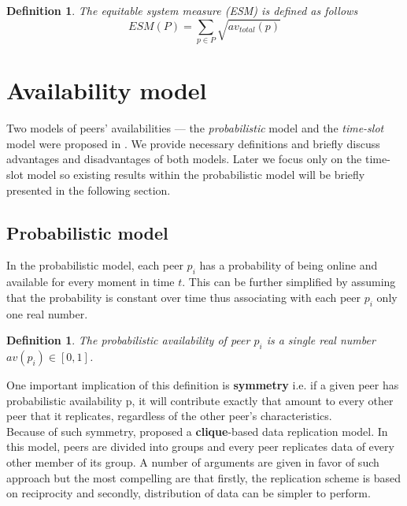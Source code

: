 \documentclass{pracamgren}
\newcounter{collective_ctr} \numberwithin{collective_ctr}{chapter}
\newtheorem{definition}[collective_ctr]{Definition}
\begin{document}
\begin{definition}
The {\it equitable system measure (ESM)} is defined as follows
$$ESM(P) = \sum_{p\in P} \sqrt{av_{total}(p)}$$
\end{definition}

\section{Availability model}\label{sect:ava}

Two models of peers' availabilities --- the {\it probabilistic} model and the {\it time-slot} model were proposed in \cite{krz}. We provide necessary definitions and briefly discuss advantages and disadvantages of both models. Later we focus only on the time-slot model so existing results within the probabilistic model will be briefly presented in the following section.

\subsection{Probabilistic model}


In the probabilistic model, each peer $p_i$ has a probability of being online and available for every moment in time $t$. This can be further simplified by assuming that the probability is constant over time thus associating with each peer $p_i$ only one real number.

\begin{definition}
The {\it probabilistic availability} of peer $p_i$ is a single real number $av(p_i) \in [0,1]$.
\end{definition}

One important implication of this definition is {\bf symmetry} i.e. if a given peer has probabilistic availability p, it will contribute exactly that amount to every other peer that it replicates, regardless of the other peer's characteristics.\\

Because of such symmetry, \cite{krz} proposed a {\bf clique}-based data replication model. In this model, peers are divided into groups and every peer replicates data of every other member of its group. A number of arguments are given in favor of such approach but the most compelling are that firstly, the replication scheme is based on reciprocity and secondly, distribution of data can be simpler to perform.\\
\end{document}
